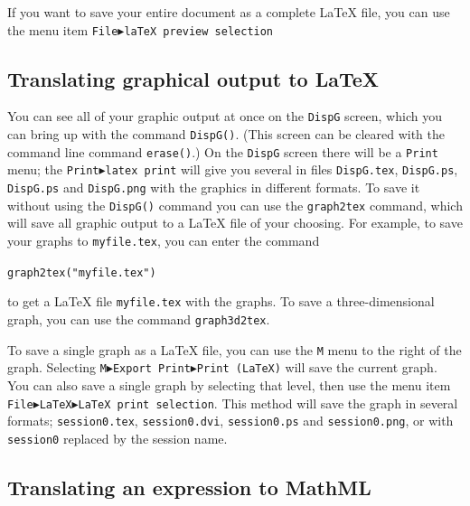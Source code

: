 \documentclass[a4paper,11pt]{book}
\begin{document}
If you want to save your entire document as a complete \LaTeX{} file,
you can use the menu item \texttt{File$\blacktriangleright$laTeX
preview selection}

\subsection{Translating graphical output to \LaTeX{}}

You can see all of your graphic output at once on the
\texttt{DispG} screen, which you can bring up with the
command \texttt{DispG()}.  (This screen can be cleared with the
command line command \texttt{erase()}.) On the \texttt{DispG} screen
there will be a \texttt{Print} menu; the
\texttt{Print$\blacktriangleright$latex print} will give you several
in files \texttt{DispG.tex}, \texttt{DispG.ps}, \texttt{DispG.ps} and
\texttt{DispG.png} with the graphics in different formats. To save it
without using the \texttt{DispG()} command you can use the
\texttt{graph2tex} command, which will save all graphic output to a
\LaTeX{} file of your choosing.  For example, to save your graphs to
\texttt{myfile.tex}, you can enter the command
\begin{center}
  {\tt graph2tex("myfile.tex")}
\end{center}
to get a \LaTeX{} file \texttt{myfile.tex} with the graphs.  To save a
three-dimensional graph, you can use the command \texttt{graph3d2tex}.

To save a single graph as a \LaTeX{} file, you can use the \texttt{M}
menu to the right of the graph.  Selecting
\texttt{M$\blacktriangleright$Export Print$\blacktriangleright$Print
(LaTeX)} will save the current graph.  You can also save a single
graph by selecting that level, then use the menu item
\texttt{File$\blacktriangleright$LaTeX$\blacktriangleright$LaTeX print
selection}.  This method will save the graph in several formats;
\texttt{session0.tex}, \texttt{session0.dvi}, \texttt{session0.ps}
and \texttt{session0.png}, or with \texttt{session0} replaced by the
session name.

\subsection{Translating an expression to MathML}
\end{document}
